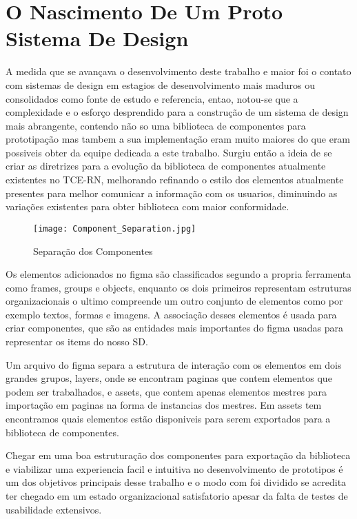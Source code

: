 \section{O Nascimento De Um Proto Sistema De Design} \label{secao34}

  A medida que se avançava o desenvolvimento deste trabalho e maior foi o contato com sistemas de design em estagios de desenvolvimento mais maduros ou consolidados como fonte de estudo e referencia, entao, notou-se que a complexidade e o esforço desprendido para a construção de um sistema de design mais abrangente, contendo não so uma biblioteca de componentes para prototipação mas tambem a sua implementação eram muito maiores do que eram possiveis obter da equipe dedicada a este trabalho. Surgiu então a ideia de se criar as diretrizes para a evolução da biblioteca de componentes atualmente existentes no TCE-RN, melhorando refinando o estilo dos elementos atualmente presentes para melhor comunicar a informação com os usuarios, diminuindo as variações existentes para obter biblioteca com maior conformidade.

  
  \begin{wrapfigure}{l}{0.5\textwidth}
    \texttt{[image: Component\_Separation.jpg]} 
    \caption{Separação dos Componentes }
    \label{fig:wrapfig}
  \end{wrapfigure}
  
  Os elementos adicionados no figma são classificados segundo a propria ferramenta como frames, groups e objects, enquanto os dois primeiros representam estruturas organizacionais o ultimo compreende um outro conjunto de elementos como por exemplo textos, formas e imagens. A associação desses elementos é usada para criar componentes, que são as entidades mais importantes do figma usadas para representar os items do nosso SD.

  Um arquivo do figma separa a estrutura de interação com os elementos em dois grandes grupos, layers, onde se encontram paginas que contem elementos que podem ser trabalhados, e assets, que contem apenas elementos mestres para importação em paginas na forma de instancias dos mestres. Em assets tem encontramos quais elementos estão disponiveis para serem exportados para a biblioteca de componentes.

  Chegar em uma boa estruturação dos componentes para exportação da biblioteca e viabilizar uma experiencia facil e intuitiva no desenvolvimento de prototipos é um dos objetivos principais desse trabalho e o modo com foi dividido se acredita ter chegado em um estado organizacional satisfatorio apesar da falta de testes de usabilidade extensivos.

